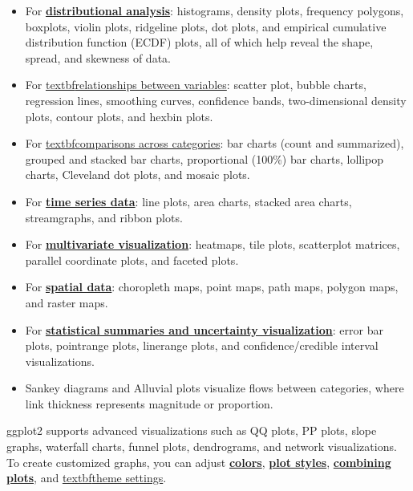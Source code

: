 \documentclass[11pt]{article}
\begin{document}
\begin{itemize}
\item For \href{https://github.com/Hiroki-Ando1998/R/tree/main/ggplot2/1_DistributionAnalysis}{\textbf{distributional analysis}}: histograms, density plots, frequency polygons, boxplots, violin plots, ridgeline plots, dot plots, and empirical cumulative distribution function (ECDF) plots, all of which help reveal the shape, spread, and skewness of data.
\item For \href{https://github.com/Hiroki-Ando1998/R/tree/main/ggplot2/2_relationship_betweem_variables}{textbf{relationships between variables}}: scatter plot, bubble charts, regression lines, smoothing curves, confidence bands, two-dimensional density plots, contour plots, and hexbin plots.
\item For \href{https://github.com/Hiroki-Ando1998/R/tree/main/ggplot2/3_comparison_across_categories}{textbf{comparisons across categories}}: bar charts (count and summarized), grouped and stacked bar charts, proportional (100\%) bar charts, lollipop charts, Cleveland dot plots, and mosaic plots.
\item For \href{https://github.com/Hiroki-Ando1998/R/tree/main/ggplot2/4_time_series_data}{\textbf{time series data}}: line plots, area charts, stacked area charts, streamgraphs, and ribbon plots.
\item For \href{https://github.com/Hiroki-Ando1998/R/tree/main/ggplot2/5_multivariate_visualization}{\textbf{multivariate visualization}}: heatmaps, tile plots, scatterplot matrices, parallel coordinate plots, and faceted plots.
\item For \href{https://github.com/Hiroki-Ando1998/R/tree/main/ggplot2/6_spatial_data}{\textbf{spatial data}}: choropleth maps, point maps, path maps, polygon maps, and raster maps.
\item For \href{https://github.com/Hiroki-Ando1998/R/tree/main/ggplot2/7_statistical_summaries&uncertainty_visualization}{\textbf{statistical summaries and uncertainty visualization}}: error bar plots, pointrange plots, linerange plots, and confidence/credible interval visualizations.
\item Sankey diagrams and Alluvial plots visualize flows between categories, where link thickness represents magnitude or proportion.
\end{itemize}
ggplot2 supports advanced visualizations such as 
QQ plots, PP plots, slope graphs, waterfall charts, funnel plots, dendrograms, and network visualizations.
To create customized graphs, you can adjust 
\href{https://github.com/Hiroki-Ando1998/R/blob/main/ggplot2/1_colour_gradation.R}{\textbf{colors}}, 
\href{https://github.com/Hiroki-Ando1998/R/blob/main/ggplot2/2_shape.md}{\textbf{plot styles}}, 
\href{https://github.com/Hiroki-Ando1998/R/blob/main/ggplot2/4_combined_figures.R}{\textbf{combining plots}}, and 
\href{https://ggplot2.tidyverse.org/reference/ggtheme.html}{textbf{theme settings}}.
\end{document}
